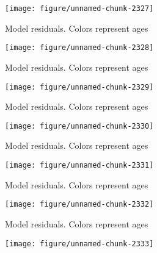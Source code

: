 \documentclass[a4paper]{article}\usepackage{graphicx, color}
\makeatletter
\def\maxwidth{ %
  \ifdim\Gin@nat@width>\linewidth
    \linewidth
  \else
    \Gin@nat@width
  \fi
}
\newenvironment{knitrout}{}{} %
\makeatother
\begin{document}
\begin{knitrout}
\begin{figure}[H]
{\centering \texttt{[image: figure/unnamed-chunk-2327]} 

}

\caption[Model residuals]{Model residuals. Colors represent ages\label{fig:unnamed-chunk-2327}}
\end{figure}
\begin{figure}[H]


{\centering \texttt{[image: figure/unnamed-chunk-2328]} 

}

\caption[Model residuals]{Model residuals. Colors represent ages\label{fig:unnamed-chunk-2328}}
\end{figure}
\begin{figure}[H]


{\centering \texttt{[image: figure/unnamed-chunk-2329]} 

}

\caption[Model residuals]{Model residuals. Colors represent ages\label{fig:unnamed-chunk-2329}}
\end{figure}
\begin{figure}[H]


{\centering \texttt{[image: figure/unnamed-chunk-2330]} 

}

\caption[Model residuals]{Model residuals. Colors represent ages\label{fig:unnamed-chunk-2330}}
\end{figure}
\begin{figure}[H]


{\centering \texttt{[image: figure/unnamed-chunk-2331]} 

}

\caption[Model residuals]{Model residuals. Colors represent ages\label{fig:unnamed-chunk-2331}}
\end{figure}
\begin{figure}[H]


{\centering \texttt{[image: figure/unnamed-chunk-2332]} 

}

\caption[Model residuals]{Model residuals. Colors represent ages\label{fig:unnamed-chunk-2332}}
\end{figure}
\begin{figure}[H]


{\centering \texttt{[image: figure/unnamed-chunk-2333]} 

}


\end{figure}
\end{knitrout}
\end{document}
